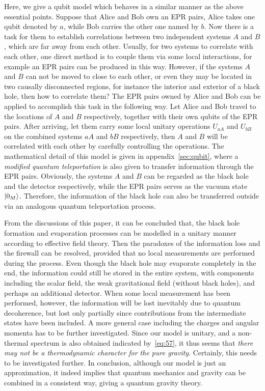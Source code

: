 \documentclass[12pt,a4paper]{article}
\begin{document}
Here, we give a qubit model which behaves in a similar manner as the above
essential points. Suppose that Alice and Bob own an EPR pairs, Alice
takes one qubit denoted by $a$, while Bob carries the other one named by
$b$. Now there is a task for them to establish correlations between two independent systems $A$ and $B$,
which are far away from each other. Usually, for two systems to
correlate with each other, one direct method is to couple them via
some local interactions, for example an EPR pairs can be produced in this way.
However, if the systems $A$ and $B$ can not be moved to close to
each other, or even they may be located in two causally disconnected regions, for instance the interior and exterior of a black hole, then how to correlate them? The EPR pairs owned by Alice and Bob can be applied to accomplish this task in the following way.
Let Alice and Bob travel to the locations of $A$ and $B$ respectively,
together with their own qubits of the EPR pairs. After arriving, let them carry some local unitary
operations $U_{aA}$ and $U_{bB}$ on the combined systems $aA$ and $bB$ respectively, then $A$ and $B$ will be correlated with each other by carefully controlling the operations.
The mathematical detail of this model is given in appendix~\ref{sec:qubit}, where a \emph{modified quantum teleportation} is also given to transfer information through the EPR pairs.
Obviously, the systems $A$ and $B$ can be regarded as the black hole and the detector respectively, while the EPR pairs serves as the vacuum state $\arrowvert0_{M}\rangle$. Therefore, the information of the black hole can also be transferred outside via an analogous quantum teleportation process.

From the discussions of this paper, it can be concluded that, the black hole formation and evaporation processes can be modelled in a unitary manner according to effective field theory. Then the paradoxes of the information loss and the firewall can be resolved, provided that no local measurements are performed during the process. Even
though the black hole may evaporate completely in the end, the
information could still be stored in the entire system, with components including the scalar field, the weak gravitational field (without black holes), and perhaps an additional detector. When some local measurement has been performed, however, the information will be lost inevitably due to quantum decoherence, but lost only partially since contributions from the intermediate states have been included. A more general case including the charges and angular momenta has to be further investigated. Since our model is unitary, and a non-thermal spectrum is also obtained indicated by~\eqref{eq:57}, it thus seems that \emph{there may not be a thermodynamic character for the pure gravity}. Certainly, this needs to be investigated further. In conclusion, although our model is just an approximation, it indeed implies that quantum mechanics and gravity can be combined in a consistent way, giving a quantum gravity theory.
\end{document}
